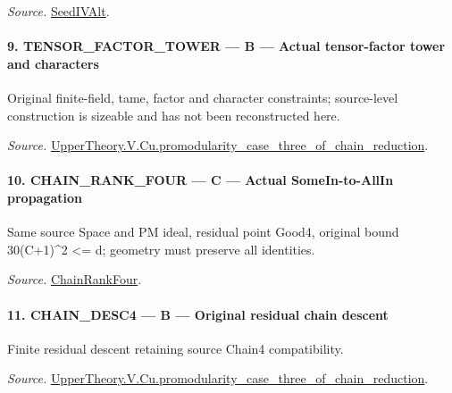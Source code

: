 \emph{Source.} \href{https://github.com/CocoSgt/riemann-hypothesis-lean/blob/7cbf7a0c32fca1badf05931879a37c3f8a2b03b4/src/Development/AutomorphicArithmetic/AutomorphicVarieties/ModularityArgument/ThresholdArguments/DenseThresholdCases/PromodularityCaseThree.lean#L19-L25}{SeedIVAlt}.



\paragraph{9. TENSOR\_\allowbreak FACTOR\_\allowbreak TOWER — B — Actual tensor-factor tower and characters}

Original finite-field, tame, factor and character constraints; source-level construction is sizeable and has not been reconstructed here.

\emph{Source.} \href{https://github.com/CocoSgt/riemann-hypothesis-lean/blob/7cbf7a0c32fca1badf05931879a37c3f8a2b03b4/src/Development/AutomorphicArithmetic/AutomorphicVarieties/ModularityArgument/ThresholdArguments/DenseThresholdCases/PromodularityCaseThreeOfLemmas.lean#L131-L153}{UpperTheory.V.Cu.promodularity\_\allowbreak case\_\allowbreak three\_\allowbreak of\_\allowbreak chain\_\allowbreak reduction}.



\paragraph{10. CHAIN\_\allowbreak RANK\_\allowbreak FOUR — C — Actual SomeIn-to-AllIn propagation}

Same source Space and PM ideal, residual point Good4, original bound 30(C+1)\textasciicircum{}2 <= d; geometry must preserve all identities.

\emph{Source.} \href{https://github.com/CocoSgt/riemann-hypothesis-lean/blob/7cbf7a0c32fca1badf05931879a37c3f8a2b03b4/src/Development/AutomorphicArithmetic/AutomorphicVarieties/ModularityArgument/ThresholdArguments/DenseThresholdCases/PromodularityCaseThree.lean#L26-L32}{ChainRankFour}.



\paragraph{11. CHAIN\_\allowbreak DESC4 — B — Original residual chain descent}

Finite residual descent retaining source Chain4 compatibility.

\emph{Source.} \href{https://github.com/CocoSgt/riemann-hypothesis-lean/blob/7cbf7a0c32fca1badf05931879a37c3f8a2b03b4/src/Development/AutomorphicArithmetic/AutomorphicVarieties/ModularityArgument/ThresholdArguments/DenseThresholdCases/PromodularityCaseThreeOfLemmas.lean#L131-L153}{UpperTheory.V.Cu.promodularity\_\allowbreak case\_\allowbreak three\_\allowbreak of\_\allowbreak chain\_\allowbreak reduction}.



